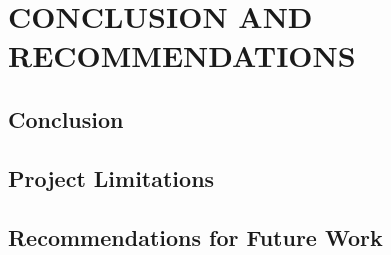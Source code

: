 \chapter{CONCLUSION AND RECOMMENDATIONS}
\label{ch:conclusion}

\section{Conclusion}
\section{Project Limitations}
\section{Recommendations for Future Work}